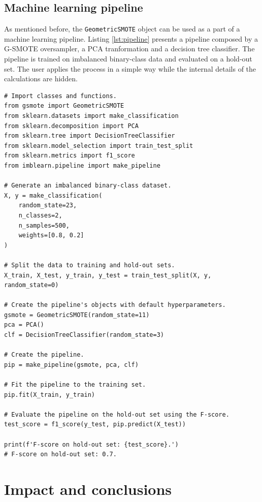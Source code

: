 \documentclass[preprint,12pt, a4paper]{elsarticle}
\begin{document}
\subsection{Machine learning pipeline}

As mentioned before, the \texttt{GeometricSMOTE} object can be used as a part of a machine learning pipeline. Listing \ref{lst:pipeline} presents a pipeline composed by a G-SMOTE oversampler, a PCA tranformation and a decision tree classifier. The pipeline is trained on imbalanced binary-class data and evaluated on a hold-out set. The user applies the process in a simple way while the internal details of the calculations are hidden.

\begin{lstlisting}[caption={Training and evaluation of a machine learning pipeline that contains the \texttt{GeometricSMOTE} object.},label={lst:pipeline}]
# Import classes and functions.
from gsmote import GeometricSMOTE
from sklearn.datasets import make_classification
from sklearn.decomposition import PCA
from sklearn.tree import DecisionTreeClassifier
from sklearn.model_selection import train_test_split
from sklearn.metrics import f1_score
from imblearn.pipeline import make_pipeline

# Generate an imbalanced binary-class dataset.
X, y = make_classification(
	random_state=23, 
	n_classes=2, 
	n_samples=500,
	weights=[0.8, 0.2]
)

# Split the data to training and hold-out sets.
X_train, X_test, y_train, y_test = train_test_split(X, y, random_state=0)

# Create the pipeline's objects with default hyperparameters.
gsmote = GeometricSMOTE(random_state=11)
pca = PCA()
clf = DecisionTreeClassifier(random_state=3)

# Create the pipeline.
pip = make_pipeline(gsmote, pca, clf)

# Fit the pipeline to the training set.
pip.fit(X_train, y_train)

# Evaluate the pipeline on the hold-out set using the F-score.
test_score = f1_score(y_test, pip.predict(X_test))

print(f'F-score on hold-out set: {test_score}.')
# F-score on hold-out set: 0.7.
\end{lstlisting}

\section{Impact and conclusions}
\end{document}

